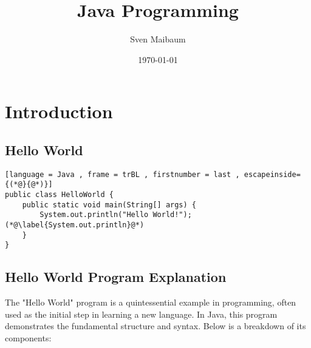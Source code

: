 \documentclass{article}
\title{Java Programming}
\author{Sven Maibaum}
\date{\today{}}
\begin{document}
\maketitle
\tableofcontents

\newpage











\section{Introduction}
\subsection{Hello World}


\begin{lstlisting}[language = Java , frame = trBL , firstnumber = last , escapeinside={(*@}{@*)}]
public class HelloWorld {
    public static void main(String[] args) {
        System.out.println("Hello World!"); (*@\label{System.out.println}@*)
    }
}
\end{lstlisting}

\subsection{Hello World Program Explanation}

The "Hello World" program is a quintessential example in programming, often used as the initial step in learning a new language. In Java, this program demonstrates the fundamental structure and syntax. Below is a breakdown of its components:
\end{document}
